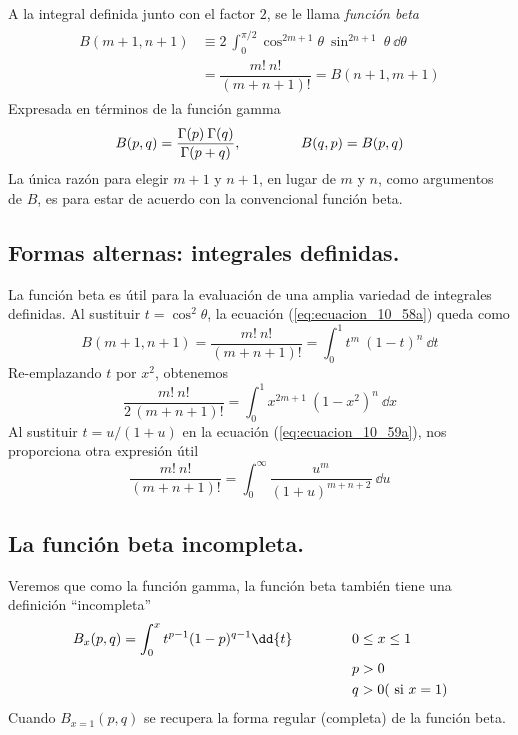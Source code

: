 A la integral definida junto con el factor $2$, se le llama \emph{función beta}
\begin{align}
\begin{aligned}
B(m+1, n+1) &\equiv 2 \: \int_{0}^{\pi/2} \cos^{2m+1} \theta \: \sin^{2n+1} \: \theta \: \dd{\theta} \\
&= \dfrac{m! \: n!}{(m+n+1)!} = B(n+1, m+1)
\label{eq:ecuacion_10_58a}
\end{aligned}
\end{align}
Expresada en términos de la función gamma
\begin{equation}
B(p, q) = \dfrac{\Gamma(p) \: \Gamma(q)}{\Gamma(p+q)}, \hspace{1.5cm} B(q, p) = B(p, q)
\label{eq:ecuacion_10_58b}
\end{equation}
La única razón para elegir $m + 1$ y $n + 1$, en lugar de $m$ y $n$, como argumentos de $B$, es para estar de acuerdo con la convencional función beta.
\newpage
\subsection{Formas alternas: integrales definidas.}
La función beta es útil para la evaluación de una amplia variedad de integrales definidas. Al sustituir $t= \cos^{2} \theta$, la ecuación (\ref{eq:ecuacion_10_58a}) queda como
\begin{equation}
B(m+1, n+1) = \dfrac{m! \: n!}{(m+n+1)!} = \int_{0}^{1} t^{m} \: (1 - t)^{n} \: \dd{t}
\label{eq:ecuacion_10_59a}
\end{equation}
Re-emplazando $t$ por $x^{2}$, obtenemos
\begin{equation}
\dfrac{m! \: n!}{2 \, (m+n+1)!} = \int_{0}^{1} x^{2m+1} \: (1-x^{2})^{n} \: \dd{x}
\label{eq:ecuacion_10_59b}
\end{equation}
Al sustituir $t= u/(1+u)$ en la ecuación (\ref{eq:ecuacion_10_59a}), nos proporciona otra expresión útil
\begin{equation}
\dfrac{m! \: n!}{(m+n+1)!} = \int_{0}^{\infty} \dfrac{u^{m}}{(1+u)^{m+n+2}} \: \dd{u}
\label{eq:ecuacion_10_60}
\end{equation}
\subsection{La función beta incompleta.}
Veremos que como la función gamma, la función beta también tiene una definición \enquote{incompleta}
\begin{align}
\begin{aligned}
B_{x}(p,q) = \int_{0}^{x} t^{p-1} (1-p)^{q-1} \dd{t} \hspace{1.5cm} & 0 \leq x \leq 1 \\
& p > 0 \\
& q > 0 (\text{ si } x=1)
\label{eq:ecuacion_10_67}
\end{aligned}
\end{align}
Cuando $B_{x=1}(p,q)$ se recupera la forma regular (completa) de la función beta.
\newpage
